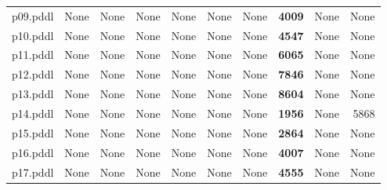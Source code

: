 \documentclass{article}
\begin{document}
\begin{tabular}{@{}lrrrrrrrrr@{}}
p09.pddl & \multicolumn{1}{|l|}{None} & \multicolumn{1}{|l|}{None} & \multicolumn{1}{|l|}{None} & \multicolumn{1}{|l|}{None} & \multicolumn{1}{|l|}{None} & \multicolumn{1}{|l|}{None} & \textbf{4009} & \multicolumn{1}{|l|}{None} & \multicolumn{1}{|l|}{None} \\
p10.pddl & \multicolumn{1}{|l|}{None} & \multicolumn{1}{|l|}{None} & \multicolumn{1}{|l|}{None} & \multicolumn{1}{|l|}{None} & \multicolumn{1}{|l|}{None} & \multicolumn{1}{|l|}{None} & \textbf{4547} & \multicolumn{1}{|l|}{None} & \multicolumn{1}{|l|}{None} \\
p11.pddl & \multicolumn{1}{|l|}{None} & \multicolumn{1}{|l|}{None} & \multicolumn{1}{|l|}{None} & \multicolumn{1}{|l|}{None} & \multicolumn{1}{|l|}{None} & \multicolumn{1}{|l|}{None} & \textbf{6065} & \multicolumn{1}{|l|}{None} & \multicolumn{1}{|l|}{None} \\
p12.pddl & \multicolumn{1}{|l|}{None} & \multicolumn{1}{|l|}{None} & \multicolumn{1}{|l|}{None} & \multicolumn{1}{|l|}{None} & \multicolumn{1}{|l|}{None} & \multicolumn{1}{|l|}{None} & \textbf{7846} & \multicolumn{1}{|l|}{None} & \multicolumn{1}{|l|}{None} \\
p13.pddl & \multicolumn{1}{|l|}{None} & \multicolumn{1}{|l|}{None} & \multicolumn{1}{|l|}{None} & \multicolumn{1}{|l|}{None} & \multicolumn{1}{|l|}{None} & \multicolumn{1}{|l|}{None} & \textbf{8604} & \multicolumn{1}{|l|}{None} & \multicolumn{1}{|l|}{None} \\
p14.pddl & \multicolumn{1}{|l|}{None} & \multicolumn{1}{|l|}{None} & \multicolumn{1}{|l|}{None} & \multicolumn{1}{|l|}{None} & \multicolumn{1}{|l|}{None} & \multicolumn{1}{|l|}{None} & \textbf{1956} & \multicolumn{1}{|l|}{None} & 5868 \\
p15.pddl & \multicolumn{1}{|l|}{None} & \multicolumn{1}{|l|}{None} & \multicolumn{1}{|l|}{None} & \multicolumn{1}{|l|}{None} & \multicolumn{1}{|l|}{None} & \multicolumn{1}{|l|}{None} & \textbf{2864} & \multicolumn{1}{|l|}{None} & \multicolumn{1}{|l|}{None} \\
p16.pddl & \multicolumn{1}{|l|}{None} & \multicolumn{1}{|l|}{None} & \multicolumn{1}{|l|}{None} & \multicolumn{1}{|l|}{None} & \multicolumn{1}{|l|}{None} & \multicolumn{1}{|l|}{None} & \textbf{4007} & \multicolumn{1}{|l|}{None} & \multicolumn{1}{|l|}{None} \\
p17.pddl & \multicolumn{1}{|l|}{None} & \multicolumn{1}{|l|}{None} & \multicolumn{1}{|l|}{None} & \multicolumn{1}{|l|}{None} & \multicolumn{1}{|l|}{None} & \multicolumn{1}{|l|}{None} & \textbf{4555} & \multicolumn{1}{|l|}{None} & \multicolumn{1}{|l|}{None} \\

\end{tabular}
\end{document}
